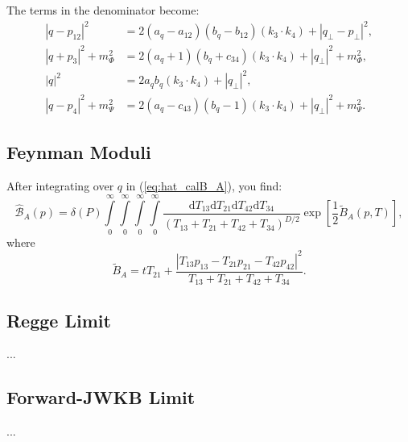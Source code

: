 The terms in the denominator become:
\begin{align}
	|q - p_{12}|^{2} &= 2 (a_{q} - a_{12})(b_{q} - b_{12})(k_{3} \cdot k_{4}) + |q_{\perp} - p_{\perp}|^{2}, \\
	|q + p_{3}|^{2} + m_{\Phi}^{2} &= 2 (a_{q} + 1)(b_{q} + c_{34})(k_{3} \cdot k_{4}) + |q_{\perp}|^{2} + m_{\Phi}^{2}, \\
	|q|^{2} &= 2 a_{q} b_{q} (k_{3} \cdot k_{4}) + |q_{\perp}|^{2}, \\
	|q - p_{4}|^{2} + m_{\Psi}^{2} &= 2 (a_{q} - c_{43})(b_{q} - 1)(k_{3} \cdot k_{4}) + |q_{\perp}|^{2} + m_{\Psi}^{2}.
\end{align}
\subsection{Feynman Moduli}
After integrating over $q$ in (\ref{eq:hat_calB_A}), you find:
\begin{equation}
	\widehat{\mathcal{B}}_{A}(p) = \delta(P) \int\limits_{0}^{\infty} \int\limits_{0}^{\infty} \int\limits_{0}^{\infty} \int\limits_{0}^{\infty} \frac{\mathrm{d}T_{13} \mathrm{d}T_{21} \mathrm{d}T_{42} \mathrm{d}T_{34}}{(T_{13} + T_{21} + T_{42} + T_{34})^{D/2}} \exp{\left[ \frac{1}{2} \tilde{B}_{A}(p, T) \right]},
\end{equation}
where
\begin{equation}
	\tilde{B}_{A} = t T_{21} + \frac{|T_{13} p_{13} - T_{21} p_{21} - T_{42} p_{42}|^{2}}{T_{13} + T_{21} + T_{42} + T_{34}}.
\end{equation}
\subsection{Regge Limit}
...
\subsection{Forward-JWKB Limit}
...
